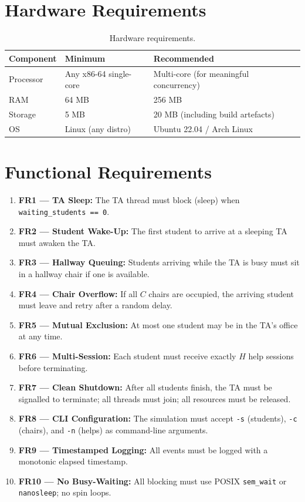 \documentclass[12pt,a4paper]{report}
\begin{document}
\section{Hardware Requirements}

\begin{table}[H]
  \centering
  \caption{Hardware requirements.}
  \label{tab:hardware}
  \begin{tabular}{lll}
    \toprule
    \textbf{Component} & \textbf{Minimum} & \textbf{Recommended} \\
    \midrule
    Processor  & Any x86-64 single-core & Multi-core (for meaningful concurrency) \\
    RAM        & 64 MB                  & 256 MB \\
    Storage    & 5 MB                   & 20 MB (including build artefacts) \\
    OS         & Linux (any distro)     & Ubuntu 22.04 / Arch Linux \\
    \bottomrule
  \end{tabular}
\end{table}

\section{Functional Requirements}

\begin{enumerate}[leftmargin=2em,itemsep=3pt]
  \item \textbf{FR1 — TA Sleep:} The TA thread must block (sleep) when \texttt{waiting\_students == 0}.
  \item \textbf{FR2 — Student Wake-Up:} The first student to arrive at a sleeping TA must awaken the TA.
  \item \textbf{FR3 — Hallway Queuing:} Students arriving while the TA is busy must sit in a hallway chair if one is available.
  \item \textbf{FR4 — Chair Overflow:} If all $C$ chairs are occupied, the arriving student must leave and retry after a random delay.
  \item \textbf{FR5 — Mutual Exclusion:} At most one student may be in the TA's office at any time.
  \item \textbf{FR6 — Multi-Session:} Each student must receive exactly $H$ help sessions before terminating.
  \item \textbf{FR7 — Clean Shutdown:} After all students finish, the TA must be signalled to terminate; all threads must join; all resources must be released.
  \item \textbf{FR8 — CLI Configuration:} The simulation must accept \texttt{-s} (students), \texttt{-c} (chairs), and \texttt{-n} (helps) as command-line arguments.
  \item \textbf{FR9 — Timestamped Logging:} All events must be logged with a monotonic elapsed timestamp.
  \item \textbf{FR10 — No Busy-Waiting:} All blocking must use POSIX \texttt{sem\_wait} or \texttt{nanosleep}; no spin loops.
\end{enumerate}
\end{document}
